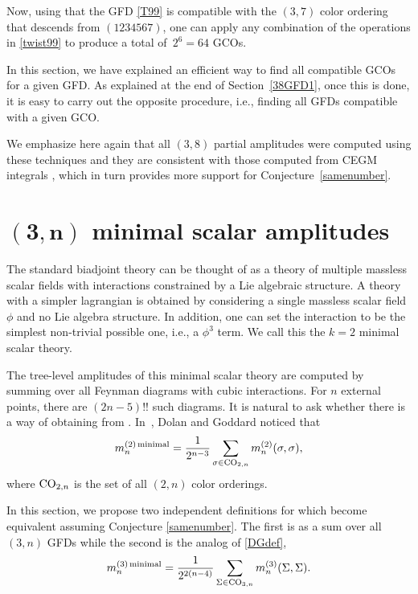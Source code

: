 \documentclass[pdftex]{sigma}
\theoremstyle{definition}
\def \be {\begin{equation}}
\def \ee {\end{equation}}
\def \be {\begin{equation}}
\def \min {{\rm minimal}}
\numberwithin{equation}{section}
\begin{document}
Now, using that the GFD \eqref{T99} is compatible with the $(3,7)$ color ordering that descends from $(1234567)$, one can apply any combination of the operations in \eqref{twist99} to produce a total of~$2^6=64$ GCOs.

In this section, we have explained an efficient way to find all compatible GCOs for a given GFD. As explained at the end of Section~\ref{38GFD1}, once this is done, it is easy to carry out the opposite procedure, i.e., finding all GFDs compatible with a given GCO.

We emphasize here again that all $(3,8)$ partial amplitudes were computed using these techniques and they are consistent with those computed from CEGM integrals \cite{Cachazo:2023ltw}, which in turn provides more support for Conjecture~\ref{samenumber}.

\section[(3,n) minimal scalar amplitudes]{$\boldsymbol{(3,n)}$ minimal scalar amplitudes}\label{sec8}


The standard biadjoint theory can be thought of as a theory of multiple massless scalar fields with interactions constrained by a Lie algebraic structure. A theory with a simpler lagrangian is obtained by considering a single massless scalar field $\phi$ and no Lie algebra structure. In addition, one can set the interaction to be the simplest non-trivial possible one, i.e., a $\phi^3$ term. We call this the $k=2$ minimal scalar theory.

The tree-level amplitudes of this minimal scalar theory are computed by summing over all Feynman diagrams with cubic interactions. For $n$ external points, there are $(2n-5)!!$ such diagrams. It is natural to ask whether there is a way of obtaining \smash{$m_{n}^{(2)\,\min }$} from . In~\cite{Dolan:2014ega}, Dolan and Goddard noticed that
\be\label{DGdef}
m_{n}^{(2)\, \min } = \frac{1}{2^{n-3}}\sum_{\sigma \in {\rm CO}_{2,n}}m_{n}^{(2)}(\sigma,\sigma),
\ee
where ${\rm CO}_{2,n}$ is the set of all $(2,n)$ color orderings.

In this section, we propose two independent definitions for \smash{$m_{n}^{(3)\, \min}$} which become equivalent assuming Conjecture \ref{samenumber}. The first is as a sum over all $(3,n)$ GFDs while the second is the analog of \eqref{DGdef},
\be\label{ourDef}
m_{n}^{(3)\, \min } = \frac{1}{2^{2(n-4)}}\sum_{\Sigma \in {\rm CO}_{3,n}}m_{n}^{(3)}(\Sigma,\Sigma).
\ee
\end{document}

